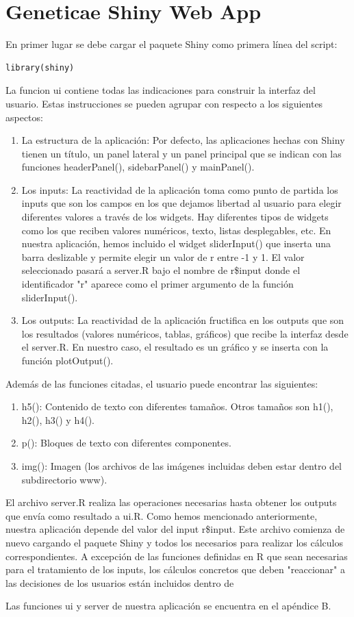 \section{Geneticae Shiny Web App}

En primer lugar se debe cargar el paquete Shiny como primera línea del script:

\begin{lstlisting}[frame=single]
library(shiny) 
\end{lstlisting}

La funcion ui contiene todas las indicaciones para construir la interfaz del usuario. Estas instrucciones se pueden agrupar con respecto a los siguientes aspectos:
\begin{enumerate}
\item La estructura de la aplicación: Por defecto, las aplicaciones hechas con Shiny tienen un título, un panel lateral y un panel principal que se indican con las funciones headerPanel(), sidebarPanel() y mainPanel().
\item Los inputs: La reactividad de la aplicación toma como punto de partida los inputs que son los campos en los que dejamos libertad al usuario para elegir diferentes valores a través de los widgets. Hay diferentes tipos de widgets como los que reciben valores numéricos, texto, listas desplegables, etc. En nuestra aplicación, hemos incluido el widget sliderInput() que inserta una barra deslizable y permite elegir un valor de r entre -1 y 1. El valor seleccionado pasará a server.R bajo el nombre de r\$input donde el identificador "r" aparece como el primer argumento de la función sliderInput().
\item Los outputs: La reactividad de la aplicación fructifica en los outputs que son los resultados (valores numéricos, tablas, gráficos) que recibe la interfaz desde el server.R. En nuestro caso, el resultado es un gráfico y se inserta con la función
plotOutput().
\end{enumerate}

Además de las funciones citadas, el usuario puede encontrar las siguientes:
\begin{enumerate}
\item  h5(): Contenido de texto con diferentes tamaños. Otros tamaños son h1(), h2(), h3() y h4().
\item p(): Bloques de texto con diferentes componentes.
\item img(): Imagen (los archivos de las imágenes incluidas deben estar dentro del subdirectorio www).
\end{enumerate}

El archivo server.R realiza las operaciones necesarias hasta obtener los outputs que envía como resultado a ui.R. Como hemos mencionado anteriormente, nuestra aplicación depende del valor del input r\$input. Este archivo comienza de nuevo cargando el paquete Shiny y todos los necesarios para realizar los cálculos correspondientes. A excepción de las funciones definidas en R que sean necesarias para el tratamiento de los inputs, los cálculos concretos que deben "reaccionar" a las decisiones de los usuarios están incluidos dentro de  


Las funciones ui y server de nuestra aplicación se encuentra en el apéndice B.


